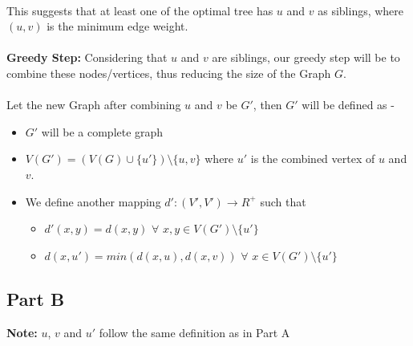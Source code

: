 \documentclass{article}
\begin{document}
        \\
        This suggests that at least one of the optimal tree has $u$ and $v$ as siblings, where $(u, v)$ is the minimum edge weight.
        \\
        \\
        \textbf{Greedy Step:} Considering that $u$ and $v$ are siblings, our greedy step will be to combine these nodes/vertices, thus reducing the size of the Graph $G$.
        \\
        \\
        Let the new Graph after combining $u$ and $v$ be $G'$, then $G'$ will be defined as -
        \begin{itemize}
            \item $G'$ will be a complete graph
            \item $V(G') = (V(G) \cup \{u'\}) \setminus \{u, v\}$ where $u'$ is the combined vertex of $u$ and $v$.
            \item We define another mapping $d':(V', V') \rightarrow R^+$ such that
            \begin{itemize}
                \item $d'(x, y) = d(x, y)$ $\forall$ $x, y \in V(G') \setminus \{u'\}$
                \item $d(x, u') = min(d(x, u), d(x, v))$ $\forall$ $x \in V(G') \setminus \{u'\}$
            \end{itemize}
        \end{itemize}
        
    \subsection*{Part B}
    
        \textbf{Note:} $u$, $v$ and $u'$ follow the same definition as in Part A
    
\end{document}
